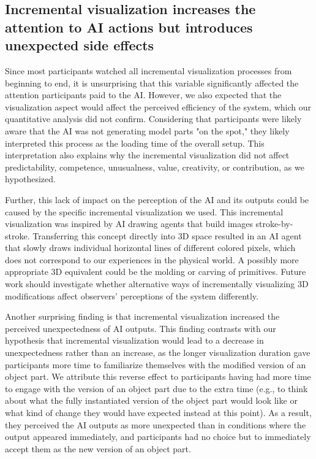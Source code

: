 \subsection{Incremental visualization increases the attention to AI actions but introduces unexpected side effects}
Since most participants watched all incremental visualization processes from beginning to end, it is unsurprising that this variable significantly affected the attention participants paid to the AI. However, we also expected that the visualization aspect would affect the perceived efficiency of the system, which our quantitative analysis did not confirm. Considering that participants were likely aware that the AI was not generating model parts "on the spot," they likely interpreted this process as the loading time of the overall setup. This interpretation also explains why the incremental visualization did not affect predictability, competence, unusualness, value, creativity, or contribution, as we hypothesized.

Further, this lack of impact on the perception of the AI and its outputs could be caused by the specific incremental visualization we used. This incremental visualization was inspired by AI drawing agents that build images stroke-by-stroke. Transferring this concept directly into 3D space resulted in an AI agent that slowly draws individual horizontal lines of different colored pixels, which does not correspond to our experiences in the physical world. A possibly more appropriate 3D equivalent could be the molding or carving of primitives.
Future work should investigate whether alternative ways of incrementally visualizing 3D modifications affect observers' perceptions of the system differently.

Another surprising finding is that incremental visualization increased the perceived unexpectedness of AI outputs. This finding contrasts with our hypothesis that incremental visualization would lead to a decrease in unexpectedness rather than an increase, as the longer visualization duration gave participants more time to familiarize themselves with the modified version of an object part. We attribute this reverse effect to participants having had more time to engage with the version of an object part due to the extra time (e.g., to think about what the fully instantiated version of the object part would look like or what kind of change they would have expected instead at this point). As a result, they perceived the AI outputs as more unexpected than in conditions where the output appeared immediately, and participants had no choice but to immediately accept them as the new version of an object part.

